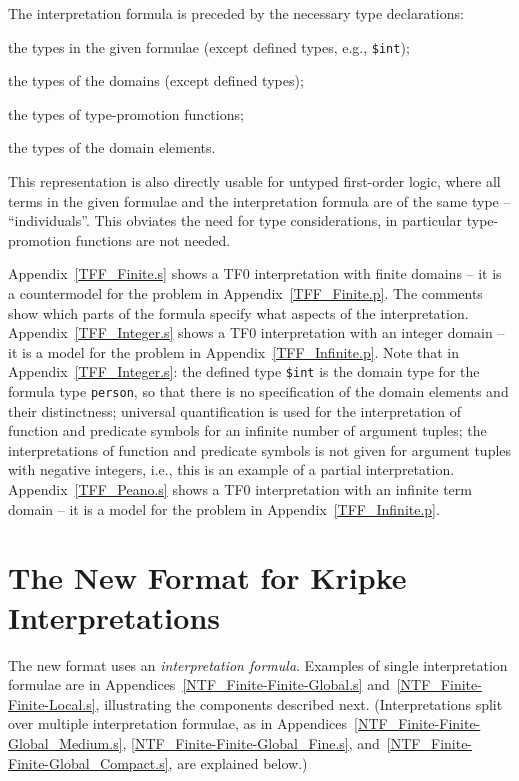 \documentclass{easychair}
\newcommand{\smalltt}[1]{\small \texttt{#1}}
\newenvironment{packed_itemize}{
\vspace*{-0.2em}
\begin{itemize}
\setlength{\partopsep}{0pt}
\setlength{\itemsep}{1pt}
\setlength{\parskip}{0pt}
\setlength{\parsep}{0pt}
}{\end{itemize}}
\begin{document}
The interpretation formula is preceded by the necessary type declarations:
\begin{packed_itemize}
\item the types in the given formulae (except defined types, e.g., {\smalltt{\$int}});
\item the types of the domains (except defined types);
\item the types of type-promotion functions;
\item the types of the domain elements.
\end{packed_itemize}
This representation is also directly usable for untyped first-order logic, where all terms in 
the given formulae and the interpretation formula are of the same type – ``individuals''. 
This obviates the need for type considerations, in particular type-promotion functions are not 
needed.

Appendix~\ref{TFF_Finite.s} shows a TF0 interpretation with finite domains -- it is a 
countermodel for the problem in Appendix~\ref{TFF_Finite.p}.
The comments show which parts of the formula specify what aspects of the interpretation.
Appendix~\ref{TFF_Integer.s} shows a TF0 interpretation with an integer domain -- it 
is a model for the problem in Appendix~\ref{TFF_Infinite.p}.
Note that in Appendix~\ref{TFF_Integer.s}:
the defined type {\smalltt{\$int}} is the domain type for the formula type 
{\smalltt{person}}, so that there is no specification of the domain elements and their 
distinctness;
universal quantification is used for the interpretation of function and predicate
symbols for an infinite number of argument tuples;
the interpretations of function and predicate symbols is not given for argument 
tuples with negative integers, i.e., this is an example of a partial interpretation.
Appendix~\ref{TFF_Peano.s} shows a TF0 interpretation with an infinite term domain -- it 
is a model for the problem in Appendix~\ref{TFF_Infinite.p}.

\section{The New Format for Kripke Interpretations}
\label{NewKripke}
 
The new format uses an {\em interpretation formula}. 
Examples of single interpretation formulae are in Appendices~\ref{NTF_Finite-Finite-Global.s}
and~\ref{NTF_Finite-Finite-Local.s}, illustrating the components 
described next. 
(Interpretations split over multiple interpretation formulae, as in 
Appendices~\ref{NTF_Finite-Finite-Global_Medium.s}, \ref{NTF_Finite-Finite-Global_Fine.s},
and~\ref{NTF_Finite-Finite-Global_Compact.s}, are explained below.)
\end{document}
